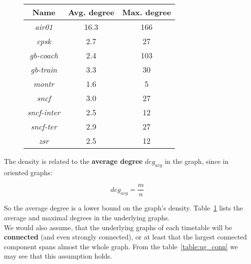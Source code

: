 \begin{figure}[htb]
{\begin{minipage}{0.45\textwidth}
		\centering
		\begin{tabular}{c|c|c}
			\rowcolor{tablehead}
			\textbf{Name} & \textbf{Avg. degree} & \textbf{Max. degree}\\
			\hline
			\textit{air01} & 16.3 & 166 \\
			\textit{cpsk} & 2.7 & 27 \\
			\textit{gb-coach} & 2.4 & 103 \\
			\textit{gb-train} & 3.3 & 30 \\
			\textit{montr} & 1.6 & 5 \\
			\textit{sncf} & 3.0 & 27 \\
			\textit{sncf-inter} & 2.5 & 12 \\
			\textit{sncf-ter} & 2.9 & 27 \\
			\textit{zsr} & 2.5 & 12 \\
		\end{tabular}
		\label{table:ug_degs}
	\end{minipage}
    }
	\end{figure}
	
	\noindent The density is related to the \textbf{average degree} $deg_{avg}$ in the graph, since in oriented graphs:
	
	$$deg_{avg} = \frac{\displaystyle m}{\displaystyle n}$$
	
	\noindent So the average degree is a lower bound on the graph's density. Table~\ref{table:ug_degs} lists the average and maximal degrees in the underlying graphs. \\
	
	\noindent We would also assume, that the underlying graphs of each timetable will be \textbf{connected} (and even strongly connected), or at least that the largest connected component spans almost the whole graph. From the table~\ref{table:ug_conn} we may see that this assumption holds. \\

